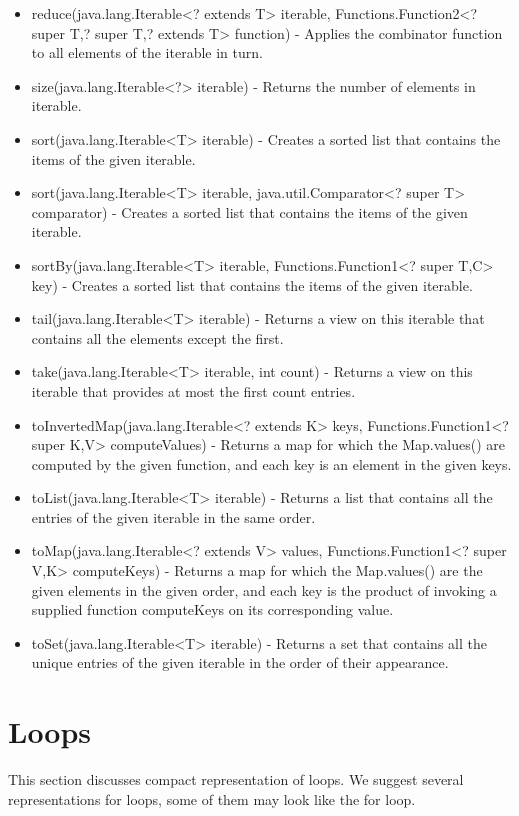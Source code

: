 \begin{itemize}
	\item reduce(java.lang.Iterable<? extends T> iterable, Functions.Function2<? super T,? super T,? extends T> function) - Applies the combinator function to all elements of the iterable in turn.
	\item size(java.lang.Iterable<?> iterable) - Returns the number of elements in iterable.
	\item sort(java.lang.Iterable<T> iterable) - Creates a sorted list that contains the items of the given iterable.
	\item sort(java.lang.Iterable<T> iterable, java.util.Comparator<? super T> comparator) - Creates a sorted list that contains the items of the given iterable.
	\item sortBy(java.lang.Iterable<T> iterable, Functions.Function1<? super T,C> key) - Creates a sorted list that contains the items of the given iterable.
	\item tail(java.lang.Iterable<T> iterable) - Returns a view on this iterable that contains all the elements except the first.
	\item take(java.lang.Iterable<T> iterable, int count) - Returns a view on this iterable that provides at most the first count entries.
	\item toInvertedMap(java.lang.Iterable<? extends K> keys, Functions.Function1<? super K,V> computeValues) - Returns a map for which the Map.values() are computed by the given function, and each key is an element in the given keys.
	\item toList(java.lang.Iterable<T> iterable) - Returns a list that contains all the entries of the given iterable in the same order.
	\item toMap(java.lang.Iterable<? extends V> values, Functions.Function1<? super V,K> computeKeys) - Returns a map for which the Map.values() are the given elements in the given order, and each key is the product of invoking a supplied function computeKeys on its corresponding value.
	\item toSet(java.lang.Iterable<T> iterable) - Returns a set that contains all the unique entries of the given iterable in the order of their appearance.
\end{itemize}
\section{Loops}
This section discusses compact representation of loops. We suggest several representations for loops, some of them may look like the for loop.
